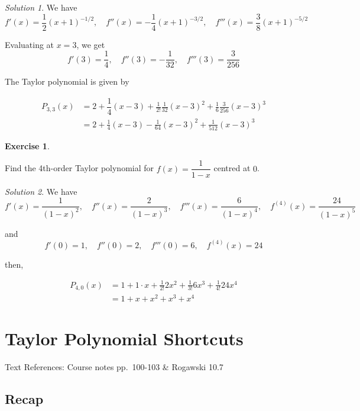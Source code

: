 \documentclass[
]{book}
\theoremstyle{definition}
\theoremstyle{definition}
\theoremstyle{definition}
\newtheorem{exercise}{Exercise}[chapter]
\theoremstyle{definition}
\theoremstyle{remark}
\newtheorem*{solution}{Solution}
\begin{document}
\begin{solution}

We have \[f'(x)=\frac{1}{2}(x+1)^{-1/2}, \quad f''(x)= -\frac{1}{4}(x+1)^{-3/2}, \quad f'''(x)= \frac{3}{8}(x+1)^{-5/2}\]

Evaluating at \(x=3\), we get \[f'(3)=\frac{1}{4}, \quad f''(3) = -\frac{1}{32}, \quad f'''(3) = \frac{3}{256}\]

The Taylor polynomial is given by

\begin{align*}
P_{3,3}(x) &= 2+ \dfrac{1}{4}(x-3)+\frac{1}{2!}\frac{1}{32}(x-3)^2+ \frac{1}{6}\frac{3}{256}(x-3)^3\\
&= 2+ \frac{1}{4}(x-3)-\frac{1}{64}(x-3)^2+\frac{1}{512}(x-3)^3
\end{align*}

\end{solution}

\begin{exercise}
\protect\hypertarget{exr:unlabeled-div-150}{}\label{exr:unlabeled-div-150}

Find the 4th-order Taylor polynomial for \(f(x)=\dfrac{1}{1-x}\) centred at \(0\).

\end{exercise}

\begin{solution}

We have \[f'(x)=\frac{1}{(1-x)^2}, \quad f''(x) = \frac{2}{(1-x)^3}, \quad f'''(x)=\frac{6}{(1-x)^4}, \quad f^{(4)}(x) = \frac{24}{(1-x)^5}\]

and \[f'(0)=1, \quad f''(0)=2, \quad f'''(0)=6, \quad f^{(4)}(x)=24\]

then,

\begin{align*}
P_{4,0}(x) &= 1+1\cdot x + \frac{1}{2!}2x^2+\frac{1}{3!}6x^3+\frac{1}{4!}24x^4\\
&= 1+x+x^2+x^3+x^4
\end{align*}

\end{solution}

\hypertarget{lec-21}{%
\chapter{Taylor Polynomial Shortcuts}\label{lec-21}}

Text References: Course notes pp.~100-103 \& Rogawski 10.7

\hypertarget{recap-19}{%
\section{Recap}\label{recap-19}}
\end{document}

